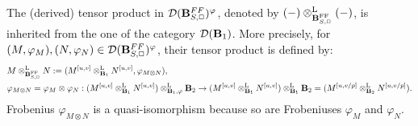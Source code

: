 \documentclass[10pt,reqno]{amsart}
\theoremstyle{definition}
\theoremstyle{remark}
\def\phi{\varphi}
\newcommand{\LL}{\operatorname{L} }
\newcommand{\FF}{\operatorname{FF} }
\newcommand{\sd}{{\mathcal{D}}}
\numberwithin{equation}{section}
\numberwithin{equation}{section}
\begin{document}
   The (derived) tensor product in  ${\sd}(\B^{\rm FF}_{S,\Box})^{\phi}$, 
     denoted by $(-)\otimes^{\LL}_{\B^{\FF}_{S,\Box}}(-)$,  is  inherited from the one of the 
    category   $\sd(\B_1)$. More precisely,
 for $(M,\phi_M), (N,\phi_N)\in {\sd}(\B^{\rm FF}_{S,\Box})^{\phi} $, their  tensor product is defined by: 
    \begin{align*}
    & M\otimes^{\LL}_{\B^{\FF}_{S,\Box}}N:=(M^{[u,v]}\otimes^{\LL}_{\B_1}N^{[u,v]}, \phi_{M\otimes N}), \\
     & \phi_{M\otimes N}=\phi_M\otimes\phi_N: (M^{[u,v]}\otimes^{\LL}_{\B_1}N^{[u,v]})\otimes^{\LL}_{\B_1,\phi}\B_2
       \to    (M^{[u,v]}\otimes^{\LL}_{\B_1}N^{[u,v]})\otimes^{\LL}_{{\B_1}}\B_2
     =   (M^{[u,v/p]}\otimes^{\LL}_{\B_{2}}N^{[u,v/p]}).
    \end{align*}
 Frobenius $\phi_{M\otimes N}$ is a quasi-isomorphism because so are Frobeniuses $\phi_M$ and $\phi_N$. 
   
\end{document}
